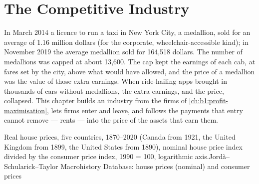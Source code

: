\chapter{The Competitive Industry}\label{ch:b1:competitive-industry}

In March 2014 a licence to run a taxi in New York City, a medallion, sold for
an average of 1.16 million dollars (for the corporate, wheelchair-accessible
kind); in November 2019 the average medallion sold for
164,518 dollars. %
The number of medallions was capped at about 13,600. The cap kept the earnings of each cab, at fares set by the city, above
what  would have allowed, and the
price of a medallion was the value of those extra earnings. When ride-hailing
apps brought in thousands of cars without medallions, the extra earnings,
and the price, collapsed. This chapter builds an industry from the firms of
\cref{ch:b1:profit-maximisation}, lets firms enter and leave, and follows
the payments that entry cannot remove --- rents --- into the price of the
assets that earn them.

\begin{openingchart}{Real house prices, five countries, 1870--2020 (Canada from
1921, the United Kingdom from 1899, the United States from 1890), nominal
house price index divided by the consumer price index, 1990 = 100,
logarithmic axis.}{Jord\`a--Schularick--Taylor Macrohistory Database: house
prices (nominal) and consumer prices}
\end{openingchart}

